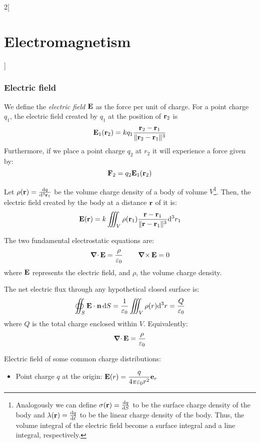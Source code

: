 \documentclass[../../../main.tex]{subfiles}
\begin{document}
\begin{multicols}{2}[\section{Electromagnetism}]
  \subsubsection{Electric field}
  \begin{proposition}
    We define the \emph{electric field} $\boldsymbol{\mathrm{E}}$ as the force per unit of charge. For a point charge $q_1$, the electric field created by $q_1$ at the position of $\boldsymbol{\mathrm{r}}_2$ is $$\boldsymbol{\mathrm{E}}_1(\boldsymbol{\mathrm{r}}_2)=kq_1\frac{\boldsymbol{\mathrm{r}}_2-\boldsymbol{\mathrm{r}}_1}{\|\boldsymbol{\mathrm{r}}_2-\boldsymbol{\mathrm{r}}_1\|^3}$$ Furthermore, if we place a point charge $q_2$ at $r_2$ it will experience a force given by: $$\boldsymbol{\mathrm{F}}_2=q_2\boldsymbol{\mathrm{E}}_1(\boldsymbol{\mathrm{r}}_2)$$
  \end{proposition}
  \begin{proposition}
    Let $\rho(\boldsymbol{\mathrm{r}})=\dv{q}{^3\boldsymbol{\mathrm{r}}_1}$ be the volume charge density of a body of volume $V$\footnote{Analogously we can define $\sigma(\boldsymbol{\mathrm{r}})=\dv{q}{S}$ to be the surface charge density of the body and $\lambda(\boldsymbol{\mathrm{r}})=\dv{q}{\ell}$ to be the linear charge density of the body. Thus, the volume integral of the electric field become a surface integral and a line integral, respectively.}. Then, the electric field created by the body at a distance $\boldsymbol{\mathrm{r}}$ of it is: $$\boldsymbol{\mathrm{E}}(\boldsymbol{\mathrm{r}})=k\iiint_V\rho(\boldsymbol{\mathrm{r}}_1)\frac{\boldsymbol{\mathrm{r}}-\boldsymbol{\mathrm{r}}_1}{\|\boldsymbol{\mathrm{r}}-\boldsymbol{\mathrm{r}}_1\|^3}\dd^3{r_1}$$
  \end{proposition}
  \begin{theorem}
    The two fundamental electrostatic equations are:
    $$\operatorname{\boldsymbol{\mathrm{\nabla}}\cdot}\boldsymbol{\mathrm{E}}=\frac{\rho}{\varepsilon_0}\qquad\operatorname{\boldsymbol{\mathrm{\nabla}}\times}\boldsymbol{\mathrm{E}}=0$$
    where $\boldsymbol{\mathrm{E}}$ represents the electric field, and $\rho$, the volume charge density.
  \end{theorem}
  \begin{theorem}
    The net electric flux through any hypothetical closed surface is:
    $$
      \oiint_S\boldsymbol{\mathrm{E}}\cdot\boldsymbol{\mathrm{n}}\dd{S}=\frac{1}{\varepsilon_0}\iiint_V\rho(r)\dd^3 r=\frac{Q}{\varepsilon_0}
    $$
    where $Q$ is the total charge enclosed within $V$. Equivalently:
    \begin{equation}
      \operatorname{\boldsymbol{\mathrm{\nabla}}\cdot}\boldsymbol{\mathrm{E}}=\frac{\rho}{\varepsilon_0}
      \label{E_gauss}
    \end{equation}
  \end{theorem}
  \begin{proposition}
    Electric field of some common charge distributions:
    \begin{itemize}
      \item Point charge $q$ at the origin: $\displaystyle \boldsymbol{\mathrm{E}}(r)=\frac{q}{4\pi\varepsilon_0 r^2}\boldsymbol{\mathrm{e}}_r$

\end{itemize}
\end{proposition}
\end{multicols}
\end{document}
